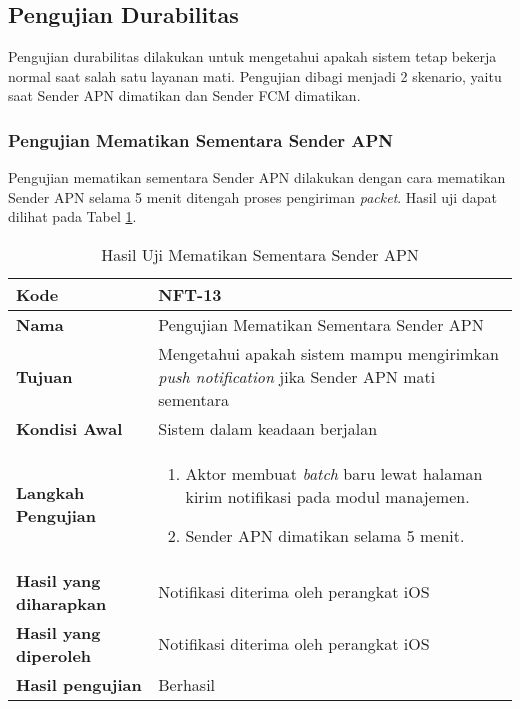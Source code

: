 \subsection{Pengujian Durabilitas}
\par Pengujian durabilitas dilakukan untuk mengetahui apakah sistem tetap bekerja normal saat salah satu layanan mati. Pengujian dibagi menjadi 2 skenario, yaitu saat Sender APN dimatikan dan Sender FCM dimatikan.

\subsubsection{Pengujian Mematikan Sementara Sender APN}
\par Pengujian mematikan sementara Sender APN dilakukan dengan cara mematikan Sender APN selama 5 menit ditengah proses pengiriman \textit{packet}. Hasil uji dapat dilihat pada Tabel \ref{t:nft_sender_apn_mati}.
\begin{longtable}{|p{3cm}|p{6.5cm}|}
	\caption{Hasil Uji Mematikan Sementara Sender APN} \label{t:nft_sender_apn_mati} \\ \hline
	\textbf{Kode} & NFT-13 \\ \hline
	\textbf{Nama} & Pengujian Mematikan Sementara Sender APN \\ \hline
	\textbf{Tujuan} & Mengetahui apakah sistem mampu mengirimkan \textit{push notification} jika Sender APN mati sementara \\ \hline
	\textbf{Kondisi Awal} & Sistem dalam keadaan berjalan \\ \hline
	\textbf{Langkah Pengujian} &  
	\begin{enumerate}
		\item Aktor membuat \textit{batch} baru lewat halaman kirim notifikasi pada modul manajemen.
		\item Sender APN dimatikan selama 5 menit.
	\end{enumerate} \\ \hline
	\textbf{Hasil yang diharapkan} & Notifikasi diterima oleh perangkat iOS \\ \hline
	\textbf{Hasil yang diperoleh} & Notifikasi diterima oleh perangkat iOS \\ \hline
	\textbf{Hasil pengujian} & Berhasil \\ \hline
\end{longtable}

